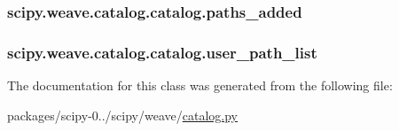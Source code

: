 \subsubsection[{paths\+\_\+added}]{\setlength{\rightskip}{0pt plus 5cm}scipy.\+weave.\+catalog.\+catalog.\+paths\+\_\+added}\label{classscipy_1_1weave_1_1catalog_1_1catalog_ab15f313507364c4523f25895e53f52e6}
\hypertarget{classscipy_1_1weave_1_1catalog_1_1catalog_a7e9ccbad5ee7f3c748f5c947dbea5609}{}
\subsubsection[{user\+\_\+path\+\_\+list}]{\setlength{\rightskip}{0pt plus 5cm}scipy.\+weave.\+catalog.\+catalog.\+user\+\_\+path\+\_\+list}\label{classscipy_1_1weave_1_1catalog_1_1catalog_a7e9ccbad5ee7f3c748f5c947dbea5609}


The documentation for this class was generated from the following file\+:\begin{DoxyCompactItemize}
\item 
packages/scipy-\/0../scipy/weave/\hyperlink{catalog_8py}{catalog.\+py}\end{DoxyCompactItemize}
